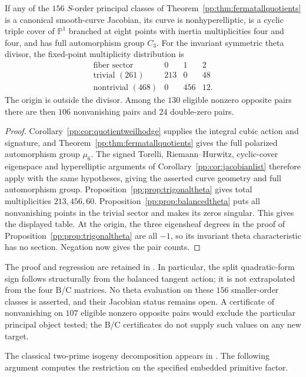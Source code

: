 \begin{corollary}
\label{pp:cor:smallerjacobian}
If any of the $156$ $S$-order principal classes of
Theorem~\ref{pp:thm:fermatallquotients} is a canonical smooth-curve
Jacobian, its curve is nonhyperelliptic, is a cyclic triple cover of
$\mathbb P^1$ branched at eight points with inertia multiplicities
four and four, and has full automorphism group $C_3$.
For the invariant symmetric theta divisor, the fixed-point
multiplicity distribution is
\[
\begin{array}{c|rrr}
\text{fiber sector}&0&1&2\\\hline
\text{trivial }(261)&213&0&48\\
\text{nontrivial }(468)&0&456&12.
\end{array}
\]
The origin is outside the divisor. Among the $130$ eligible nonzero
opposite pairs there are then $106$ nonvanishing pairs and $24$
double-zero pairs.
\end{corollary}
\begin{proof}
Corollary~\ref{pp:cor:quotientweilhodge} supplies the integral cubic
action and signature, and Theorem~\ref{pp:thm:fermatallquotients}
gives the full polarized automorphism group $\mu_6$.
The signed Torelli, Riemann--Hurwitz, cyclic-cover eigenspace and
hyperelliptic arguments of Corollary~\ref{pp:cor:jacobianlist}
therefore apply with the same hypotheses, giving the asserted curve
geometry and full automorphism group.
Proposition~\ref{pp:prop:trigonaltheta} gives total multiplicities
$213,456,60$. Proposition~\ref{pp:prop:balancedtheta} puts all
nonvanishing points in the trivial sector and makes its zeros
singular. This gives the displayed table. At the origin, the three
eigensheaf degrees in the proof of
Proposition~\ref{pp:prop:trigonaltheta} are all $-1$, so its
invariant theta characteristic has no section. Negation now gives
the pair counts.
\end{proof}

The proof and regression are retained in
. In particular, the split
quadratic-form sign follows structurally from the balanced tangent
action; it is not extrapolated from the four B/C matrices.
No theta evaluation on these $156$ smaller-order classes is asserted,
and their Jacobian status remains open. A certificate of nonvanishing
on $107$ eligible nonzero opposite pairs would exclude the particular
principal object tested; the B/C certificates do not supply such
values on any new target.

The classical two-prime isogeny decomposition appears in
\cite[Eq.~(4.2) and Lem.~4.2]{Goodson2024}. The following argument
computes the restriction on the specified embedded primitive factor.

